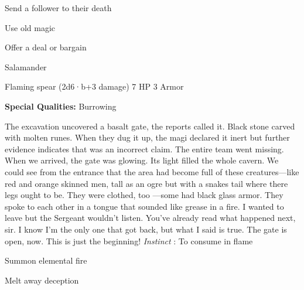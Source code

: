 \startitemize[1,packed]

\item Send a follower to their death

 
\item Use old magic

 
\item Offer a deal or bargain


\stopitemize
 
\startMonsterName
Salamander	 
\stopMonsterName
 

Flaming spear (2d6·b+3 damage)	7 HP	3 Armor

 


 
\startMonsterQualities
{\bf Special Qualities:}  Burrowing
\stopMonsterQualities
 
\startMonsterDescription
The excavation uncovered a basalt gate, the reports called it. Black stone carved with molten runes. When they dug it up, the magi declared it inert but further evidence indicates that was an incorrect claim. The entire team went missing. When we arrived, the gate was glowing. Its light filled the whole cavern. We could see from the entrance that the area had become full of these creatures—like red and orange skinned men, tall as an ogre but with a snakes tail where there legs ought to be. They were clothed, too —some had black glass armor. They spoke to each other in a tongue that sounded like grease in a fire. I wanted to leave but the Sergeant wouldn’t listen. You’ve already read what happened next, sir. I know I’m the only one that got back, but what I said is true. The gate is open, now. This is just the beginning! {\em Instinct} : To consume in flame
\stopMonsterDescription
 
\startitemize[1,packed]

\item Summon elemental fire

 
\item Melt away deception


\stopitemize
 






